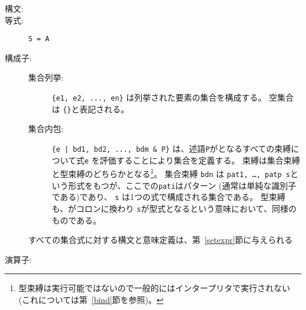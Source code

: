 \documentclass[\pformat,12pt]{jarticle}
\begin{document}
\begin{description}
\item[構文:] 
  

\item[等式:] {\tt S =  A}

\item[構成子:] \mbox{}

  \begin{description}
  \item[集合列挙:] \verb|{e1, e2, ..., en}|  は列挙された要素の集合を構成する。
空集合は {\tt \{\}}と表記される。
  
  \item[集合内包:] \verb+{e | bd1, bd2, ..., bdm & P}+
    は、述語{\tt P}がとなるすべての束縛について式{\tt e} を評価することにより集合を定義する。
    束縛は集合束縛と型束縛のどちらかとなる\footnote{型束縛は実行可能ではないので一般的にはインタープリタで実行されない (これについては第~\ref{bind}節を参照)。}。  
集合束縛 {\tt bdn} は {\tt pat1, \ldots, patp  s}という形式をもつが、ここでの{\tt pati}はパターン (通常は単純な識別子である)であり、 {\tt s} は1つの式で構成される集合である。 
型束縛も、がコロンに換わり {\tt s}が型式となるという意味において、同様のものである。 
  \end{description}
  すべての集合式に対する構文と意味定義は、第~\ref{setexpr}節に与えられる
\item[演算子:] \mbox{}


\end{description}
\end{document}
